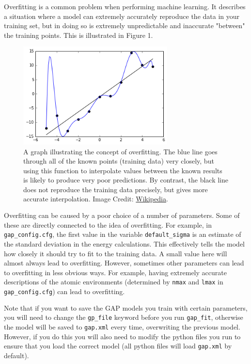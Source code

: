 \documentclass{article}
\begin{document}
Overfitting is a common problem when performing machine learning. It describes a situation where a model can extremely accurately reproduce the data in your training set, but in doing so is extremely unpredictable and inaccurate "between" the training points. This is illustrated in Figure 1.

\begin{figure}[t]

\centering

\includegraphics[width=0.7\textwidth]{Overfitted_Data.png}
\caption{A graph illustrating the concept of overfitting. The blue line goes through all of the known points (training data) very closely, but using this function to interpolate values between the known results is likely to produce very poor predictions. By contrast, the black line does not reproduce the training data precisely, but gives more accurate interpolation. Image Credit: \href{https://en.wikipedia.org/wiki/Overfitting}{Wikipedia}.}

\end{figure}

Overfitting can be caused by a poor choice of a number of parameters. Some of these are directly connected to the idea of overfitting. For example, in \verb|gap_config.cfg|, the first value in the variable \verb|default_sigma| is an estimate of the standard deviation in the energy calculations. This effectively tells the model how closely it should try to fit to the training data. A small value here will almost always lead to overfitting. However, sometimes other parameters can lead to overfitting in less obvious ways. For example, having extremely accurate descriptions of the atomic environments (determined by \verb|nmax| and \verb|lmax| in \verb|gap_config.cfg|) can lead to overfitting.

Note that if you want to save the GAP models you train with certain parameters, you will need to change the \verb|gp_file| keyword before you run \verb|gap_fit|, otherwise the model will be saved to \verb|gap.xml| every time, overwriting the previous model. However, if you do this you will also need to modify the python files you run to ensure that you load the correct model (all python files will load \verb|gap.xml| by default).
\end{document}
